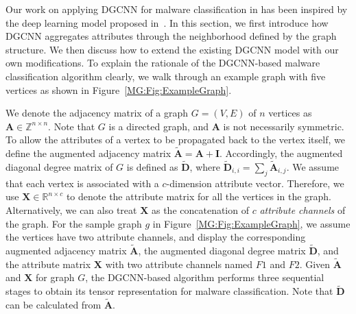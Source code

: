 \label{MG:Sec:DGCNN}

Our work on applying DGCNN for malware classification in \sysname has been inspired by the deep learning model proposed in~\cite{Dgcnn}. In this section, we first introduce how DGCNN aggregates attributes through the neighborhood defined by the graph structure. We then discuss how to extend the existing DGCNN model with our own modifications. To explain the rationale of the DGCNN-based malware classification algorithm clearly, we walk through an example graph with five vertices as shown in Figure~\ref{MG:Fig:ExampleGraph}.


 We denote the adjacency matrix of a graph $G=(V, E)$ of $n$ vertices as $\mathbf{A} \in \mathbb{Z} ^{n\times n}$.
Note that $G$ is a directed graph, and $\mathbf{A}$ is not necessarily symmetric.
To allow the attributes of a vertex to be propagated back to the vertex itself, we define the augmented adjacency matrix $\tilde{\mathbf{A}} = \mathbf{A} + \mathbf{I}$.
Accordingly, the augmented diagonal degree matrix of $G$ is defined as $\tilde{\mathbf{D}}$, where
$\tilde{\mathbf{D}}_{i,i} = \sum_j \tilde{\mathbf{A}}_{i,j}$.
We assume that each vertex is associated with a $c$-dimension attribute vector.
Therefore, we use $\mathbf{X} \in \mathbb{R}^{n \times c}$ to denote the attribute matrix for all the vertices in the graph. %
Alternatively, we can also treat $\mathbf{X}$ as the concatenation of $c$ \textit{attribute channels} of the graph.
For the sample graph $g$ in Figure~\ref{MG:Fig:ExampleGraph}, we assume the vertices have two attribute channels,
and display the corresponding augmented adjacency matrix $\tilde{\mathbf{A}}$, the augmented diagonal degree matrix $\tilde{\mathbf{D}}$,
and the attribute matrix $\mathbf{X}$ with two attribute channels named $F1$ and $F2$.
Given $\tilde{\mathbf{A}}$ and $\mathbf{X}$ for graph $G$, the DGCNN-based algorithm performs three sequential stages to obtain its tensor representation for malware classification. Note that $\tilde{\mathbf{D}}$ can be calculated from $\tilde{\mathbf{A}}$.


